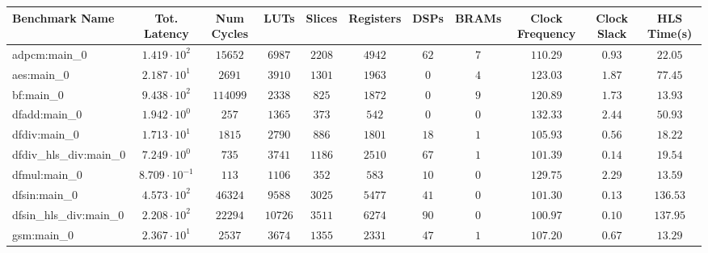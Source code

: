 \begin{tabular}{|l|c|c|c|c|c|c|c|c|c|c|}
\hline
Benchmark Name          & Tot. Latency            & Num Cycles & LUTs      & Slices    & Registers & DSPs    & BRAMs  & Clock Frequency & Clock Slack & HLS Time(s) \\
\hline
adpcm:main\_0           & $ 1.419 \cdot 10^{2}  $ & $ 15652  $ & $ 6987  $ & $ 2208  $ & $ 4942  $ & $ 62  $ & $ 7  $ & $ 110.29      $ & $ 0.93    $ & $ 22.05   $ \\
aes:main\_0             & $ 2.187 \cdot 10^{1}  $ & $ 2691   $ & $ 3910  $ & $ 1301  $ & $ 1963  $ & $ 0   $ & $ 4  $ & $ 123.03      $ & $ 1.87    $ & $ 77.45   $ \\
bf:main\_0              & $ 9.438 \cdot 10^{2}  $ & $ 114099 $ & $ 2338  $ & $ 825   $ & $ 1872  $ & $ 0   $ & $ 9  $ & $ 120.89      $ & $ 1.73    $ & $ 13.93   $ \\
dfadd:main\_0           & $ 1.942 \cdot 10^{0}  $ & $ 257    $ & $ 1365  $ & $ 373   $ & $ 542   $ & $ 0   $ & $ 0  $ & $ 132.33      $ & $ 2.44    $ & $ 50.93   $ \\
dfdiv:main\_0           & $ 1.713 \cdot 10^{1}  $ & $ 1815   $ & $ 2790  $ & $ 886   $ & $ 1801  $ & $ 18  $ & $ 1  $ & $ 105.93      $ & $ 0.56    $ & $ 18.22   $ \\
dfdiv\_hls\_div:main\_0 & $ 7.249 \cdot 10^{0}  $ & $ 735    $ & $ 3741  $ & $ 1186  $ & $ 2510  $ & $ 67  $ & $ 1  $ & $ 101.39      $ & $ 0.14    $ & $ 19.54   $ \\
dfmul:main\_0           & $ 8.709 \cdot 10^{-1} $ & $ 113    $ & $ 1106  $ & $ 352   $ & $ 583   $ & $ 10  $ & $ 0  $ & $ 129.75      $ & $ 2.29    $ & $ 13.59   $ \\
dfsin:main\_0           & $ 4.573 \cdot 10^{2}  $ & $ 46324  $ & $ 9588  $ & $ 3025  $ & $ 5477  $ & $ 41  $ & $ 0  $ & $ 101.30      $ & $ 0.13    $ & $ 136.53  $ \\
dfsin\_hls\_div:main\_0 & $ 2.208 \cdot 10^{2}  $ & $ 22294  $ & $ 10726 $ & $ 3511  $ & $ 6274  $ & $ 90  $ & $ 0  $ & $ 100.97      $ & $ 0.10    $ & $ 137.95  $ \\
gsm:main\_0             & $ 2.367 \cdot 10^{1}  $ & $ 2537   $ & $ 3674  $ & $ 1355  $ & $ 2331  $ & $ 47  $ & $ 1  $ & $ 107.20      $ & $ 0.67    $ & $ 13.29   $ \\

\end{tabular}
